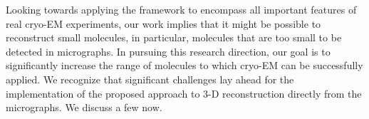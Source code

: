\documentclass[english,11pt]{article}
\newcommand{\1}{\mathbf{1}}
\newcommand{\TODO}[1]{{\color{red}{[#1]}}}
\numberwithin{equation}{section}
\theoremstyle{plain}
\theoremstyle{definition}
\theoremstyle{remark}
\theoremstyle{plain}
\theoremstyle{remark}
\theoremstyle{plain}
\theoremstyle{plain}
\begin{document}
Looking towards applying the framework to encompass all important features of real cryo-EM experiments, our work implies that it might be possible to reconstruct small molecules, in particular, molecules that are too small to be detected in micrographs. 
In pursuing this research direction, our goal is to significantly increase the range of molecules to which cryo-EM can be successfully applied.
We recognize that significant challenges lay ahead for the implementation of the proposed approach to 3-D reconstruction directly from the micrographs. We discuss a few now.




\TODO{
	We should also incorporate Alberto's comment that our technique also allows to use much lower defocus values. Lower defocus means lower contrast, but will maintain higher frequency information. From that perspective, we may be able to get high resolution reconstructions from fewer micrographs, just because we would be using lower defocus. }



%


\end{document}
